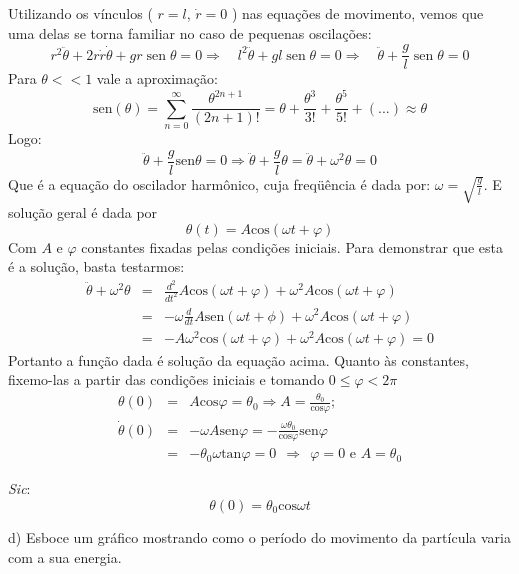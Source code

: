\begin{enumerate}[start=1,label={\bfseries Q\arabic*.}]
\resposta Utilizando os vínculos ( $r = l$, $\dot{r} = 0$ ) nas equações de movimento, vemos que uma delas se torna familiar no caso de pequenas oscilações:
$$
r^{2} \ddot{\theta} + 2r\dot{r} \dot{\theta} + gr \operatorname{sen} \theta = 0 \Rightarrow \quad l^{2} \ddot{\theta} + gl \operatorname{sen} \theta = 0 \Rightarrow \quad \ddot{\theta} + \frac{g}{l} \operatorname{sen} \theta = 0
$$
Para $\theta << 1$ vale a aproximação:
$$
\mathrm{sen}(\theta) = \sum_{n=0}^{\infty} \frac{\theta^{2n + 1}}{(2n+1)!} = \theta + \frac{\theta^{3}}{3!} + \frac{\theta^{5}}{5!} + (...) \approx \theta
$$
Logo:
$$
\ddot{\theta} + \frac{g}{l}\mathrm{sen} \theta  = 0 \Rightarrow \ddot{\theta} + \frac{g}{l} \theta =  \ddot{\theta} + \omega^{2} \theta = 0
$$
Que é a equação do oscilador harmônico, cuja freqüência é dada por: $\omega = \sqrt{\frac{g}{l}} $. E solução geral é dada por
$$
\theta (t) = A \mathrm{cos} (\omega t + \varphi)
$$
Com $A$ e $\varphi$ constantes fixadas pelas condições iniciais. Para demonstrar que esta é a solução, basta testarmos:
$$
\begin{array}{ccc}
  \ddot{\theta} + \omega^{2} \theta & = & \frac{d^{2}}{dt^{2}} A \mathrm{cos}(\omega t + \varphi) + \omega^{2} A \mathrm{cos}(\omega t + \varphi)   \\
   & = & - \omega \frac{d}{dt} A \mathrm{sen} (\omega t + \phi) + \omega^{2} A \mathrm{cos}(\omega t + \varphi) \\
   & = & - A \omega^{2} \mathrm{cos} (\omega t + \varphi) + \omega^{2} A \mathrm{cos} (\omega t + \varphi) = 0
\end{array}
$$
Portanto a função dada é solução da equação acima. Quanto às constantes, fixemo-las a partir das condições iniciais e tomando $0 \leq \varphi < 2\pi $
%
$$
\begin{array}{ccc}
\theta(0) & = & A \mathrm{cos} \varphi  =  \theta_{0} \Rightarrow A = \frac{\theta_{0}}{\mathrm{cos} \varphi}; \\
\dot{\theta}(0) & = & - \omega A \mathrm{sen} \varphi = - \frac{\omega \theta_{0}}{\mathrm{cos}\varphi } \mathrm{sen} \varphi \\
& = & - \theta_{0} \omega \mathrm{tan} \varphi = 0 \  \  \Rightarrow \  \  \varphi = 0 \mbox{ e } A = \theta_{0}
\end{array}
$$

\textit{Sic}:
$$
\theta(0) = \theta_{0} \mathrm{cos}\omega t
$$


d) Esboce um gráfico mostrando como o período do movimento da partícula varia com a sua energia.



\end{enumerate}
